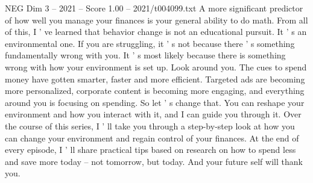 \begin{textsample}{NEG Dim 3 – 2021 – Score 1.00 – 2021/t004099.txt}
A more significant predictor of how well you manage your finances is your general ability to do math.
From all of this, I ' ve learned that behavior change is not an educational pursuit.
It ' s an environmental one.
If you are struggling, it ' s not because there ' s something fundamentally wrong with you.
It ' s most likely because there is something wrong with how your environment is set up.
Look around you.
The cues to spend money have gotten smarter, faster and more efficient.
Targeted ads are becoming more personalized, corporate content is becoming more engaging, and everything around you is focusing on spending.
So let ' s change that.
You can reshape your environment and how you interact with it, and I can guide you through it.
Over the course of this series, I ' ll take you through a step-by-step look at how you can change your environment and regain control of your finances.
At the end of every episode, I ' ll share practical tips based on research on how to spend less and save more today -- not tomorrow, but today.
And your future self will thank you.

\end{textsample}
